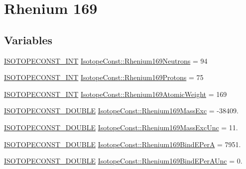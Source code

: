 \hypertarget{group___isotope_const-_rhenium-_re169}{}\section{Rhenium 169}
\label{group___isotope_const-_rhenium-_re169}
\subsection*{Variables}
\begin{DoxyCompactItemize}
\item 
\mbox{\hyperlink{group___isotope_const-_macros_ga5f18360b3e99483a35c32d789e62621c}{I\+S\+O\+T\+O\+P\+E\+C\+O\+N\+S\+T\+\_\+\+I\+NT}} \mbox{\hyperlink{group___isotope_const-_rhenium-_re169_gaa3ccc492a8557445bbef1799ce61736b}{Isotope\+Const\+::\+Rhenium169\+Neutrons}} = 94
\item 
\mbox{\hyperlink{group___isotope_const-_macros_ga5f18360b3e99483a35c32d789e62621c}{I\+S\+O\+T\+O\+P\+E\+C\+O\+N\+S\+T\+\_\+\+I\+NT}} \mbox{\hyperlink{group___isotope_const-_rhenium-_re169_ga676bb3c1e8b2cb2c271c081c54604a6d}{Isotope\+Const\+::\+Rhenium169\+Protons}} = 75
\item 
\mbox{\hyperlink{group___isotope_const-_macros_ga5f18360b3e99483a35c32d789e62621c}{I\+S\+O\+T\+O\+P\+E\+C\+O\+N\+S\+T\+\_\+\+I\+NT}} \mbox{\hyperlink{group___isotope_const-_rhenium-_re169_ga052a484714d4e71887fbd1c661e4517c}{Isotope\+Const\+::\+Rhenium169\+Atomic\+Weight}} = 169
\item 
\mbox{\hyperlink{group___isotope_const-_macros_ga8f45a7272ce02c0b4c65c44636ed719a}{I\+S\+O\+T\+O\+P\+E\+C\+O\+N\+S\+T\+\_\+\+D\+O\+U\+B\+LE}} \mbox{\hyperlink{group___isotope_const-_rhenium-_re169_gaf11b8ba996ca7f6eead886d59819a20d}{Isotope\+Const\+::\+Rhenium169\+Mass\+Exc}} = -\/38409.
\item 
\mbox{\hyperlink{group___isotope_const-_macros_ga8f45a7272ce02c0b4c65c44636ed719a}{I\+S\+O\+T\+O\+P\+E\+C\+O\+N\+S\+T\+\_\+\+D\+O\+U\+B\+LE}} \mbox{\hyperlink{group___isotope_const-_rhenium-_re169_ga1f9f0fd59c60a8576628ab2840b42ebf}{Isotope\+Const\+::\+Rhenium169\+Mass\+Exc\+Unc}} = 11.
\item 
\mbox{\hyperlink{group___isotope_const-_macros_ga8f45a7272ce02c0b4c65c44636ed719a}{I\+S\+O\+T\+O\+P\+E\+C\+O\+N\+S\+T\+\_\+\+D\+O\+U\+B\+LE}} \mbox{\hyperlink{group___isotope_const-_rhenium-_re169_ga48f535d1682cc97720ac0c526be23fbd}{Isotope\+Const\+::\+Rhenium169\+Bind\+E\+PerA}} = 7951.
\item 
\mbox{\hyperlink{group___isotope_const-_macros_ga8f45a7272ce02c0b4c65c44636ed719a}{I\+S\+O\+T\+O\+P\+E\+C\+O\+N\+S\+T\+\_\+\+D\+O\+U\+B\+LE}} \mbox{\hyperlink{group___isotope_const-_rhenium-_re169_ga52994ab04d2b32ea9675ff2803fa40f7}{Isotope\+Const\+::\+Rhenium169\+Bind\+E\+Per\+A\+Unc}} = 0.

\end{DoxyCompactItemize}
